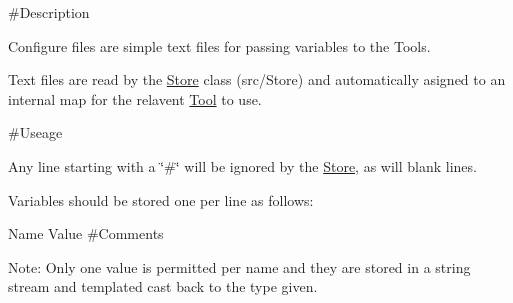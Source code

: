 

 \#\-Description 



Configure files are simple text files for passing variables to the Tools.

Text files are read by the \hyperlink{classStore}{Store} class (src/\-Store) and automatically asigned to an internal map for the relavent \hyperlink{classTool}{Tool} to use.



 \#\-Useage 



Any line starting with a \char`\"{}\#\char`\"{} will be ignored by the \hyperlink{classStore}{Store}, as will blank lines.

Variables should be stored one per line as follows\-:

Name Value \#\-Comments

Note\-: Only one value is permitted per name and they are stored in a string stream and templated cast back to the type given. 